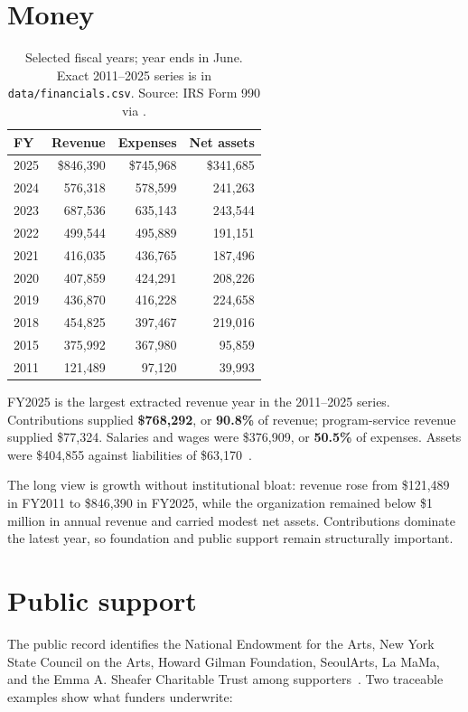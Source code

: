 \documentclass[10pt,letterpaper,twocolumn]{article}
\begin{document}
\section{Money}

\begin{table}[H]
\footnotesize\centering\setlength{\tabcolsep}{3pt}
\begin{tabular}{lrrr}
\toprule
\textbf{FY} & \textbf{Revenue} & \textbf{Expenses} & \textbf{Net assets}\\
\midrule
2025 & \$846,390 & \$745,968 & \$341,685\\
2024 & 576,318 & 578,599 & 241,263\\
2023 & 687,536 & 635,143 & 243,544\\
2022 & 499,544 & 495,889 & 191,151\\
2021 & 416,035 & 436,765 & 187,496\\
2020 & 407,859 & 424,291 & 208,226\\
2019 & 436,870 & 416,228 & 224,658\\
2018 & 454,825 & 397,467 & 219,016\\
2015 & 375,992 & 367,980 & 95,859\\
2011 & 121,489 & 97,120 & 39,993\\
\bottomrule
\end{tabular}
\caption{Selected fiscal years; year ends in June. Exact 2011--2025 series is in \texttt{data/financials.csv}. Source: IRS Form 990 via \citet{ch990}.}
\end{table}

FY2025 is the largest extracted revenue year in the 2011--2025 series. Contributions supplied \textbf{\$768,292}, or \textbf{90.8\%} of revenue; program-service revenue supplied \$77,324. Salaries and wages were \$376,909, or \textbf{50.5\%} of expenses. Assets were \$404,855 against liabilities of \$63,170~\citep{ch990}.

The long view is growth without institutional bloat: revenue rose from \$121,489 in FY2011 to \$846,390 in FY2025, while the organization remained below \$1 million in annual revenue and carried modest net assets. Contributions dominate the latest year, so foundation and public support remain structurally important.

\section{Public support}

The public record identifies the National Endowment for the Arts, New York State Council on the Arts, Howard Gilman Foundation, SeoulArts, La MaMa, and the Emma A. Sheafer Charitable Trust among supporters~\citep{chabout,gilman2025}. Two traceable examples show what funders underwrite:
\end{document}
